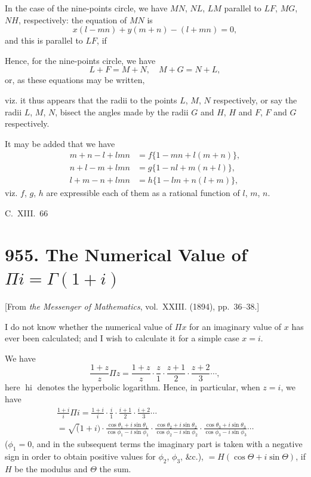 \documentclass[12pt,a4paper]{article}
\theoremstyle{definition}
\begin{document}
In the case of the nine-points circle, we have $MN$, $NL$, $LM$ parallel to $LF$, $MG$, $NH$, respectively: the equation of $MN$ is
\[
x(l-mn) + y(m+n) - (l+mn) = 0,
\]
and this is parallel to $LF$, if \dotfill

Hence, for the nine-points circle, we have
\[
L+F = M+N, \quad M+G = N+L,
\]
or, as these equations may be written, \dotfill

viz. it thus appears that the radii to the points $L$, $M$, $N$ respectively, or say the radii $L$, $M$, $N$, bisect the angles made by the radii $G$ and $H$, $H$ and $F$, $F$ and $G$ respectively.

It may be added that we have
\begin{align*}
m+n-l+lmn &= f\{1-mn+l(m+n)\},\\
n+l-m+lmn &= g\{1-nl+m(n+l)\},\\
l+m-n+lmn &= h\{1-lm+n(l+m)\},
\end{align*}
viz. $f$, $g$, $h$ are expressible each of them as a rational function of $l$, $m$, $n$.

\hfill C.~XIII.~66

\newpage
\section{955. The Numerical Value of $\Pi i = \Gamma(1+i)$}
\label{sec:955}

[From \textit{the Messenger of Mathematics}, vol.~XXIII. (1894), pp.~36--38.]
\bigskip

I do not know whether the numerical value of $\Pi x$ for an imaginary value of $x$ has ever been calculated; and I wish to calculate it for a simple case $x=i$.

We have
\[
\frac{1+z}{z}\Pi z = \frac{1+z}{z}\cdot\frac{z}{1}\cdot\frac{z+1}{2}\cdot\frac{z+2}{3}\cdots,
\]
here $\operatorname{hi}$ denotes the hyperbolic logarithm. Hence, in particular, when $z=i$, we have
\begin{multline*}
\frac{1+i}{i}\Pi i =
\frac{1+i}{i}\cdot\frac{i}{1}\cdot\frac{i+1}{2}\cdot\frac{i+2}{3}\cdots \\
= \surd(1+i) \cdot \frac{\cos\theta_1+i\sin\theta_1}{\cos\phi_1-i\sin\phi_1}
\cdot \frac{\cos\theta_2+i\sin\theta_2}{\cos\phi_2-i\sin\phi_2}
\cdot \frac{\cos\theta_3+i\sin\theta_3}{\cos\phi_3-i\sin\phi_3} \cdots
\end{multline*}
($\phi_1=0$, and in the subsequent terms the imaginary part is taken with a negative sign in order to obtain positive values for $\phi_2$, $\phi_3$, \&c.), $= H(\cos\Theta + i\sin\Theta)$, if $H$ be the modulus and $\Theta$ the sum.
\end{document}
